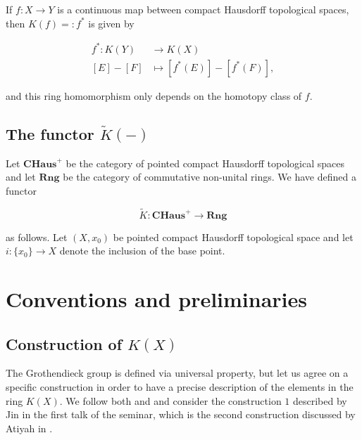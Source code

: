 \documentclass[12pt,a4paper]{amsart}
\theoremstyle{plain}
\theoremstyle{definition}
\theoremstyle{remark}
\begin{document}
If $f \colon X \to Y$ is a continuous map between compact Hausdorff topological spaces, then $K(f) =: f^{*}$ is given by

\begin{align*}
  f^{*} \colon K(Y) & \to K(X) \\
  [E] - [F] & \mapsto [f^{*}(E)] - [f^{*}(F)],
\end{align*}

and this ring homomorphism only depends on the homotopy class of $f$.

\subsection{The functor $\tilde{K}(-)$ \cite[p.~66]{ati67}}

Let $\mathbf{CHaus}^{+}$ be the category of pointed compact Hausdorff topological spaces and let $\mathbf{Rng}$ be the category of commutative non-unital rings.
We have defined a functor

\[ \tilde{K} \colon \mathbf{CHaus}^{+} \to \mathbf{Rng} \]

as follows.
Let $(X,x_{0})$ be pointed compact Hausdorff topological space and let $i \colon \{ x_{0} \} \to X$ denote the inclusion of the base point.

\appendix

\section{Conventions and preliminaries}

\subsection{Construction of $K(X)$}

The Grothendieck group is defined via universal property, but let us agree on a specific construction in order to have a precise description of the elements in the ring $K(X)$.
We follow both \cite{ati67} and \cite{hat03} and consider the construction $1$ described by Jin in the first talk of the seminar, which is the second construction discussed by Atiyah in \cite[p.~42]{ati67}.
\end{document}
